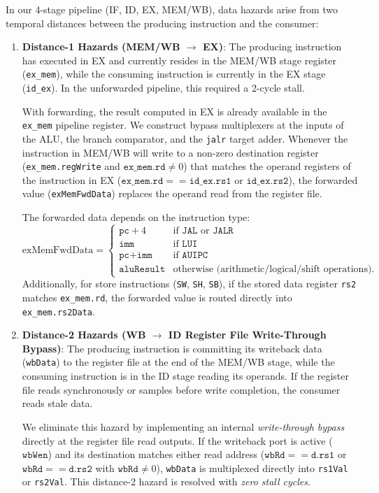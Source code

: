 In our 4-stage pipeline (IF, ID, EX, MEM/WB), data hazards arise from two temporal distances between the producing instruction and the consumer:
\begin{enumerate}
    \item \textbf{Distance-1 Hazards (MEM/WB $\to$ EX)}:
    The producing instruction has executed in EX and currently resides in the MEM/WB stage register (\texttt{ex\_mem}), while the consuming instruction is currently in the EX stage (\texttt{id\_ex}). In the unforwarded pipeline, this required a 2-cycle stall. 
    
    With forwarding, the result computed in EX is already available in the \texttt{ex\_mem} pipeline register. We construct bypass multiplexers at the inputs of the ALU, the branch comparator, and the \texttt{jalr} target adder. Whenever the instruction in MEM/WB will write to a non-zero destination register (\texttt{ex\_mem.regWrite} and $\texttt{ex\_mem.rd} \neq 0$) that matches the operand registers of the instruction in EX ($\texttt{ex\_mem.rd} == \texttt{id\_ex.rs1}$ or $\texttt{id\_ex.rs2}$), the forwarded value (\texttt{exMemFwdData}) replaces the operand read from the register file.
    
    The forwarded data depends on the instruction type:
    \begin{equation}
    \text{exMemFwdData} = 
    \begin{cases}
    \texttt{pc} + 4 & \text{if } \texttt{JAL} \text{ or } \texttt{JALR} \\
    \texttt{imm} & \text{if } \texttt{LUI} \\
    \texttt{pc} + \texttt{imm} & \text{if } \texttt{AUIPC} \\
    \texttt{aluResult} & \text{otherwise (arithmetic/logical/shift operations)}.
    \end{cases}
    \end{equation}
    Additionally, for store instructions (\texttt{SW}, \texttt{SH}, \texttt{SB}), if the stored data register \texttt{rs2} matches \texttt{ex\_mem.rd}, the forwarded value is routed directly into \texttt{ex\_mem.rs2Data}.
    
    \item \textbf{Distance-2 Hazards (WB $\to$ ID Register File Write-Through Bypass)}:
    The producing instruction is committing its writeback data (\texttt{wbData}) to the register file at the end of the MEM/WB stage, while the consuming instruction is in the ID stage reading its operands. If the register file reads synchronously or samples before write completion, the consumer reads stale data. 
    
    We eliminate this hazard by implementing an internal \textit{write-through bypass} directly at the register file read outputs. If the writeback port is active ($\texttt{wbWen}$) and its destination matches either read address ($\texttt{wbRd} == \texttt{d.rs1}$ or $\texttt{wbRd} == \texttt{d.rs2}$ with $\texttt{wbRd} \neq 0$), \texttt{wbData} is multiplexed directly into \texttt{rs1Val} or \texttt{rs2Val}. This distance-2 hazard is resolved with \textit{zero stall cycles}.
\end{enumerate}

